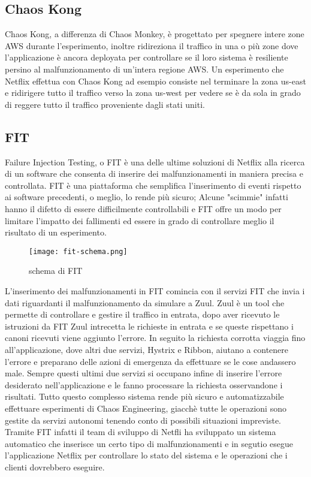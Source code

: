 \subsection{Chaos Kong}
Chaos Kong, a differenza di Chaos Monkey, è progettato per spegnere intere zone AWS durante l'esperimento, inoltre ridireziona il traffico in una o più zone dove l'applicazione è ancora deployata per controllare se il loro sistema è resiliente persino al malfunzionamento di un'intera regione AWS.
Un esperimento che Netflix effettua con Chaos Kong ad esempio consiste nel terminare la zona us-east e ridirigere tutto il traffico verso la zona us-west per vedere se è da sola in grado di reggere tutto il traffico proveniente dagli stati uniti.

\subsection{FIT}
Failure Injection Testing, o FIT è una delle ultime soluzioni di Netflix alla ricerca di un software che consenta di inserire dei malfunzionamenti in maniera precisa e controllata.
FIT è una piattaforma che semplifica l'inserimento di eventi rispetto ai software precedenti, o meglio, lo rende più sicuro; Alcune "scimmie" infatti hanno il difetto di essere difficilmente controllabili e FIT offre un modo per limitare l'impatto dei fallimenti ed essere in grado di controllare meglio il risultato di un esperimento.
\begin{figure}[]
    \centering
    \texttt{[image: fit-schema.png]}
    \caption{schema di FIT}
    \label{tab:fitschema}
\end{figure}
L'inserimento dei malfunzionamenti in FIT comincia con il servizi FIT che invia i dati riguardanti il malfunzionamento da simulare a Zuul.
Zuul è un tool che permette di controllare e gestire il traffico in entrata, dopo aver ricevuto le istruzioni da FIT Zuul intrecetta le richieste in entrata e se queste rispettano i canoni ricevuti viene aggiunto l'errore.
In seguito la richiesta corrotta viaggia fino all'applicazione, dove altri due servizi, Hystrix e Ribbon, aiutano a contenere l'errore e preparano delle azioni di emergenza da effettuare se le cose andassero male.
Sempre questi ultimi due servizi si occupano infine di inserire l'errore desiderato nell'applicazione e le fanno processare la richiesta osservandone i risultati.
Tutto questo complesso sistema rende più sicuro e automatizzabile effettuare esperimenti di Chaos Engineering, giacchè tutte le operazioni sono gestite da servizi autonomi tenendo conto di possibili situazioni impreviste.
Tramite FIT infatti il team di sviluppo di Netfli ha sviluppato un sistema automatico che inserisce un certo tipo di malfunzionamenti e in segutio esegue l'applicazione Netflix per controllare lo stato del sistema e le operazioni che i clienti dovrebbero eseguire.

